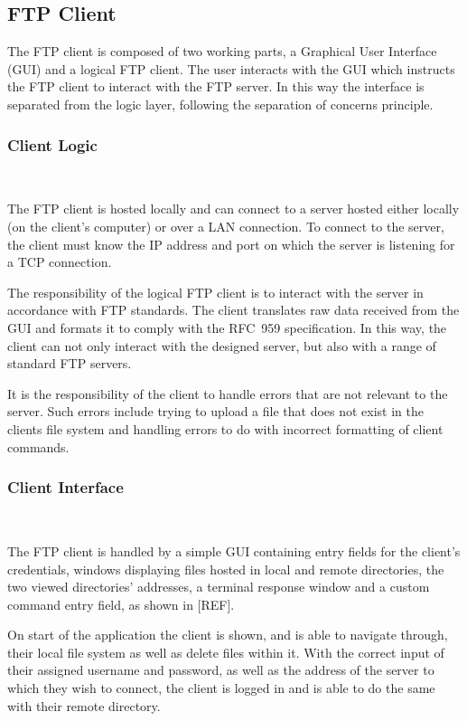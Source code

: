 \documentclass[10pt,twocolumn]{witseiepaper}
\begin{document}
\subsection{FTP Client}

The FTP client is composed of two working parts, a Graphical User Interface (GUI) and a logical FTP client. The user interacts with the GUI which instructs the FTP client to interact with the FTP server. In this way the interface is separated from the logic layer, following the separation of concerns principle.

\vspace*{-2mm}
\subsubsection{Client Logic} $     $

The FTP client is hosted locally and can connect to a server hosted either locally (on the client's computer) or over a LAN connection. To connect to the server, the client must know the IP address and port on which the server is listening for a TCP connection.

The responsibility of the logical FTP client is to interact with the server in accordance with FTP standards. The client translates raw data received from the GUI and formats it to comply with the RFC~959 specification. In this way, the client can not only interact with the designed server, but also  with a range of standard FTP servers.

It is the responsibility of the client to handle errors that are not relevant to the server. Such errors include trying to upload a file that does not exist in the clients file system and handling errors to do with incorrect formatting of client commands.

\vspace*{-2mm}
\subsubsection{Client Interface} $      $\label{GUI}

The FTP client is handled by a simple GUI containing entry fields for the client's credentials, windows displaying files hosted in local and remote directories, the two viewed directories' addresses, a terminal response window and a custom command entry field, as shown in [REF]. 

On start of the application the client is shown, and is able to navigate through, their local file system as well as delete files within it.
With the correct input of their assigned username and password, as well as the address of the server to which they wish to connect, the client is logged in and is able to do the same with their remote directory. 
\end{document}
